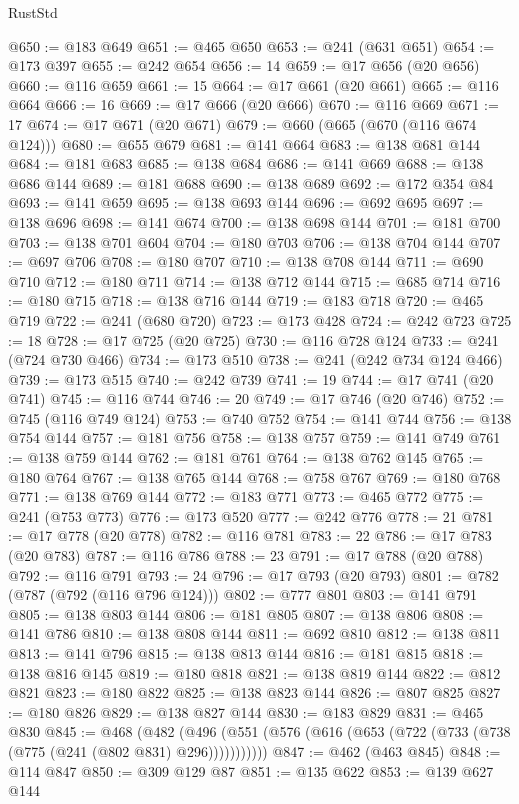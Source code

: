 \begin{lexlean}{RustStd}
\begin{coremodule}
@650 := @183 @649
@651 := @465 @650
@653 := @241 (@631 @651)
@654 := @173 @397
@655 := @242 @654
@656 := 14
@659 := @17 @656 (@20 @656)
@660 := @116 @659
@661 := 15
@664 := @17 @661 (@20 @661)
@665 := @116 @664
@666 := 16
@669 := @17 @666 (@20 @666)
@670 := @116 @669
@671 := 17
@674 := @17 @671 (@20 @671)
@679 := @660 (@665 (@670 (@116 @674 @124)))
@680 := @655 @679
@681 := @141 @664
@683 := @138 @681 @144
@684 := @181 @683
@685 := @138 @684
@686 := @141 @669
@688 := @138 @686 @144
@689 := @181 @688
@690 := @138 @689
@692 := @172 @354 @84
@693 := @141 @659
@695 := @138 @693 @144
@696 := @692 @695
@697 := @138 @696
@698 := @141 @674
@700 := @138 @698 @144
@701 := @181 @700
@703 := @138 @701 @604
@704 := @180 @703
@706 := @138 @704 @144
@707 := @697 @706
@708 := @180 @707
@710 := @138 @708 @144
@711 := @690 @710
@712 := @180 @711
@714 := @138 @712 @144
@715 := @685 @714
@716 := @180 @715
@718 := @138 @716 @144
@719 := @183 @718
@720 := @465 @719
@722 := @241 (@680 @720)
@723 := @173 @428
@724 := @242 @723
@725 := 18
@728 := @17 @725 (@20 @725)
@730 := @116 @728 @124
@733 := @241 (@724 @730 @466)
@734 := @173 @510
@738 := @241 (@242 @734 @124 @466)
@739 := @173 @515
@740 := @242 @739
@741 := 19
@744 := @17 @741 (@20 @741)
@745 := @116 @744
@746 := 20
@749 := @17 @746 (@20 @746)
@752 := @745 (@116 @749 @124)
@753 := @740 @752
@754 := @141 @744
@756 := @138 @754 @144
@757 := @181 @756
@758 := @138 @757
@759 := @141 @749
@761 := @138 @759 @144
@762 := @181 @761
@764 := @138 @762 @145
@765 := @180 @764
@767 := @138 @765 @144
@768 := @758 @767
@769 := @180 @768
@771 := @138 @769 @144
@772 := @183 @771
@773 := @465 @772
@775 := @241 (@753 @773)
@776 := @173 @520
@777 := @242 @776
@778 := 21
@781 := @17 @778 (@20 @778)
@782 := @116 @781
@783 := 22
@786 := @17 @783 (@20 @783)
@787 := @116 @786
@788 := 23
@791 := @17 @788 (@20 @788)
@792 := @116 @791
@793 := 24
@796 := @17 @793 (@20 @793)
@801 := @782 (@787 (@792 (@116 @796 @124)))
@802 := @777 @801
@803 := @141 @791
@805 := @138 @803 @144
@806 := @181 @805
@807 := @138 @806
@808 := @141 @786
@810 := @138 @808 @144
@811 := @692 @810
@812 := @138 @811
@813 := @141 @796
@815 := @138 @813 @144
@816 := @181 @815
@818 := @138 @816 @145
@819 := @180 @818
@821 := @138 @819 @144
@822 := @812 @821
@823 := @180 @822
@825 := @138 @823 @144
@826 := @807 @825
@827 := @180 @826
@829 := @138 @827 @144
@830 := @183 @829
@831 := @465 @830
@845 := @468
    (@482 (@496 (@551 (@576 (@616 (@653 (@722 (@733 (@738 (@775 (@241 (@802 @831) @296)))))))))))
@847 := @462 (@463 @845)
@848 := @114 @847
@850 := @309 @129 @87
@851 := @135 @622
@853 := @139 @627 @144

\end{coremodule}
\end{lexlean}
